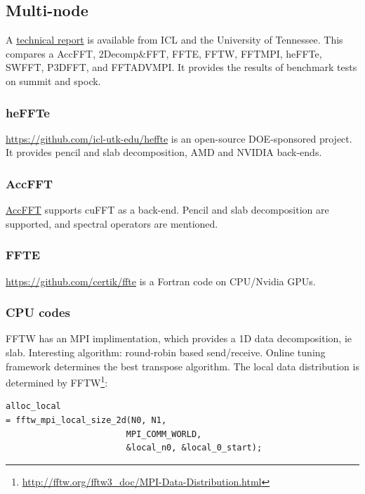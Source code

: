 \documentclass[12pt]{article}
\renewcommand{\(}{\left(}
\renewcommand{\)}{\right)}
\begin{document}
\subsection{Multi-node}

A
\href{https://icl.utk.edu/files/publications/2022/icl-utk-1548-2022.pdf}{technical
  report} is available from ICL and the University of Tennessee.  This
compares a AccFFT, 2Decomp\&FFT, FFTE, FFTW, FFTMPI, heFFTe, SWFFT,
P3DFFT, and FFTADVMPI.  It provides the results of benchmark tests
on summit and spock.

\subsubsection{heFFTe}

\href{heffte}{https://github.com/icl-utk-edu/heffte} is an open-source
DOE-sponsored project.  It provides pencil and slab decomposition, AMD
and NVIDIA back-ends.


\subsubsection{AccFFT}

\href{http://accfft.org/}{AccFFT} supports cuFFT as a back-end.
Pencil and slab decomposition are supported, and spectral operators
are mentioned.

\subsubsection{FFTE}

\url{https://github.com/certik/ffte} is a Fortran code on CPU/Nvidia
GPUs.

\subsubsection{CPU codes}

FFTW has an MPI implimentation, which provides a 1D data
decomposition, ie slab.  Interesting algorithm: round-robin based
send/receive.  Online tuning framework determines the best transpose
algorithm.  The local data distribution is determined by
FFTW\footnote{\url{http://fftw.org/fftw3_doc/MPI-Data-Distribution.html}}:
\begin{lstlisting}
alloc_local
= fftw_mpi_local_size_2d(N0, N1,
                        MPI_COMM_WORLD,
                        &local_n0, &local_0_start);
\end{lstlisting}
\end{document}
